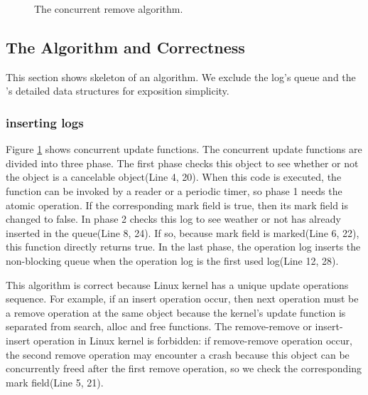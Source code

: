 \begin{figure}[h]
\begin{center}
\inputminted[linenos,fontsize=\footnotesize, tabsize=2]{c}{src/ldu_logical_b.c}
\end{center}
\caption{The \LDU concurrent remove algorithm.}
\label{fig:gldulogicalupdate}
\end{figure}


\subsection{The Algorithm and Correctness}

This section shows skeleton of an algorithm.
We exclude the log's queue and the \LDU's detailed data structures for
exposition simplicity.

\subsubsection{inserting logs}
Figure \ref{fig:gldulogicalupdate} shows concurrent update functions.
The concurrent update functions are divided into three phase.
The first phase checks this object to see whether or not the
object is a cancelable object(Line 4, 20).
When this code is executed, the  function can
be invoked by a reader or a periodic timer, so phase 1 needs the atomic operation.
If the corresponding mark field is true, then its mark field is changed to false.
In phase 2 checks this log to see weather or not has already inserted in
the queue(Line 8, 24).
If so, because mark field is marked(Line 6, 22), this function directly returns
true.
In the last phase, the operation log inserts the non-blocking queue
when the operation log is the first used log(Line 12, 28).

This algorithm is correct because Linux kernel has a unique update
operations sequence.
For example, if an insert operation occur, then next operation must be a remove
operation at the same object because the kernel's update function
is separated from search, alloc and free functions.
The remove-remove or insert-insert operation in Linux kernel is
forbidden: if remove-remove operation occur, the second remove operation may
encounter a crash because this object can be concurrently freed after the first remove
operation, so we check the corresponding mark field(Line 5, 21).

